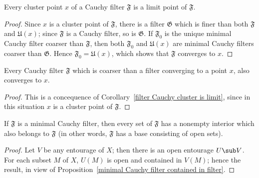\begin{corollary}\label{filter Cauchy cluster is limit}
Every cluster point $x$ of a Cauchy filter $\mathfrak{F}$ is a limit point of $\mathfrak{F}$.
\end{corollary}
\begin{proof}
Since $x$ is a cluster point of $\mathfrak{F}$, there is a filter $\mathfrak{G}$ which is finer than both $\mathfrak{F}$ and $\mathfrak{U}(x)$; since $\mathfrak{F}$ is a Cauchy filter, so is $\mathfrak{G}$. If $\mathfrak{F}_0$ is the unique minimal Cauchy filter coarser than $\mathfrak{F}$, then both $\mathfrak{F}_0$ and $\mathfrak{U}(x)$ are minimal Cauchy filters coarser than $\mathfrak{G}$. Hence $\mathfrak{F}_0=\mathfrak{U}(x)$, which shows that $\mathfrak{F}$ converges to $x$.
\end{proof}
\begin{corollary}\label{filter Cauchy coarser than converging is converging}
Every Cauchy filter $\mathfrak{F}$ which is coarser than a filter converging to a point $x$, also converges to $x$.
\end{corollary}
\begin{proof}
This is a concequence of Corollary~\ref{filter Cauchy cluster is limit}, since in this situation $x$ is a cluster point of $\mathfrak{F}$.
\end{proof}
\begin{corollary}\label{filter minimal Cauchy has open base}
If $\mathfrak{F}$ is a minimal Cauchy filter, then every set of $\mathfrak{F}$ has a nonempty interior which also belongs to $\mathfrak{F}$ (in other words, $\mathfrak{F}$ has a base consisting of open sets).
\end{corollary}
\begin{proof}
Let $V$ be any entourage of $X$; then there is an open entourage $U\sub V$. For each subset $M$ of $X$, $U(M)$ is open and contained in $V(M)$; hence the result, in view of Proposition~\ref{minimal Cauchy filter contained in filter}.
\end{proof}
